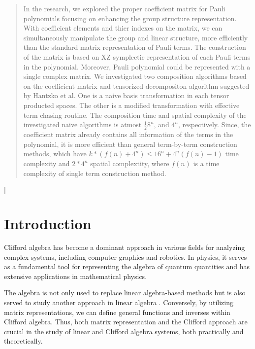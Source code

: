 \documentclass[twocolumn]{article}
\begin{document}
\begin{@twocolumnfalse}
\begin{center}
\begin{abstract}
In the research, we explored the proper coefficient 
matrix for Pauli polynomials focusing on enhancing the 
group structure representation. 
With coefficient elements and thier indexes on the matrix,
we can simultaneously manipulate the group and linear structure,
more efficiently than the standard matrix representation of Pauli terms.
The construction of the matrix is based on XZ symplectic representation of 
each Pauli terms in the polynomial. 
Moreover, Pauli polynomial could be represented with a single complex matrix.
We investigated two composition algorithms based on the coefficient matrix and 
tensorized decompositon algorithm suggested by Hantzko et al\cite{hantzko_tensorized_2023}.
One is a naive basis transformation in each tensor producted spaces.
The other is a modified transformation with effective term chasing routine.
The composition time and spatial complexity 
of the investigated naive algorithms is atmost $\frac{1}{2}8^n$, and $4^n$, respectively.
Since, the coefficient matrix already contains all information of the terms
in the polynomial, it is more efficient than general term-by-term construction methods, which have 
$k*(f(n)+4^n)\leq 16^n + 4^n(f(n)-1)$ time complexity and $2*4^n$ spatial complextity, where $f(n)$ is a time complexity of 
single term construction method.
\end{abstract}

    \end{center}
\end{@twocolumnfalse}
]

    

\section{Introduction}

Clifford algebra has become a dominant approach in various fields for analyzing complex
systems, including computer graphics and robotics. 
In physics, it serves as a fundamental tool for representing the algebra of
quantum quantities and has extensive applications in mathematical physics.

The algebra is not only used to replace linear algebra-based methods but is also served to
 study another approach in linear algebra \cite{Matrix Exponential via Clifford Algebras}.
Conversely, by utilizing matrix representations, we can define general functions and inverses
within Clifford algebra. Thus, both matrix representation and the Clifford approach are
crucial in the study of linear and Clifford algebra systems, both practically and theoretically.
\end{document}
